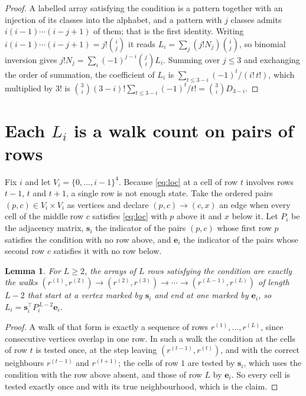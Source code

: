 \documentclass[11pt,a4paper]{article}
\theoremstyle{plain}
\newtheorem{lemma}[theorem]{Lemma}
\theoremstyle{definition}
\begin{document}
\begin{proof}
A labelled array satisfying the condition is a pattern together with an injection of its
classes into the alphabet, and a pattern with $j$ classes admits $i(i-1)\cdots(i-j+1)$ of
them; that is the first identity. Writing $i(i-1)\cdots(i-j+1)=j!\binom{i}{j}$ it reads
$L_i=\sum_j(j!N_j)\binom{i}{j}$, so binomial inversion gives
$j!N_j=\sum_i(-1)^{j-i}\binom{j}{i}L_i$. Summing over $j\le3$ and exchanging the
order of summation, the coefficient of $L_i$ is
$\sum_{t\le3-i}(-1)^t/(i!\,t!)$, which multiplied by $3!$ is
$\binom{3}{i}(3-i)!\sum_{t\le3-i}(-1)^t/t!=\binom{3}{i}D_{3-i}$.
\end{proof}

\section{Each $L_i$ is a walk count on pairs of rows}

Fix $i$ and let $V_i=\{0,\dots,i-1\}^{4}$. Because \eqref{eq:loc} at a cell of row
$t$ involves rows $t-1$, $t$ and $t+1$, a single row is not enough state. Take the
ordered pairs $(p,c)\in V_i\times V_i$ as vertices and declare $(p,c)\to(c,x)$ an edge when
every cell of the middle row $c$ satisfies \eqref{eq:loc} with $p$ above it and $x$
below it. Let $P_i$ be the adjacency matrix, $\mathbf{s}_i$ the indicator of the pairs
$(p,c)$ whose first row $p$ satisfies the condition with no row above, and
$\mathbf{e}_i$ the indicator of the pairs whose second row $c$ satisfies it with no
row below.

\begin{lemma}\label{lem:walk}
For $L\ge2$, the arrays of $L$ rows satisfying the condition are exactly the walks
$(r^{(1)},r^{(2)})\to(r^{(2)},r^{(3)})\to\cdots\to(r^{(L-1)},r^{(L)})$ of length
$L-2$ that start at a vertex marked by $\mathbf{s}_i$ and end at one marked by
$\mathbf{e}_i$, so
$L_i=\mathbf{s}_i^{\!\top}P_i^{\,L-2}\mathbf{e}_i$.
\end{lemma}

\begin{proof}
A walk of that form is exactly a sequence of rows $r^{(1)},\dots,r^{(L)}$, since
consecutive vertices overlap in one row. In such a walk the condition at the cells of
row $t$ is tested once, at the step leaving $(r^{(t-1)},r^{(t)})$, and with the
correct neighbours $r^{(t-1)}$ and $r^{(t+1)}$; the cells of row $1$ are tested by
$\mathbf{s}_i$, which uses the condition with the row above absent, and those of row
$L$ by $\mathbf{e}_i$. So every cell is tested exactly once and with its true
neighbourhood, which is the claim.
\end{proof}
\end{document}
